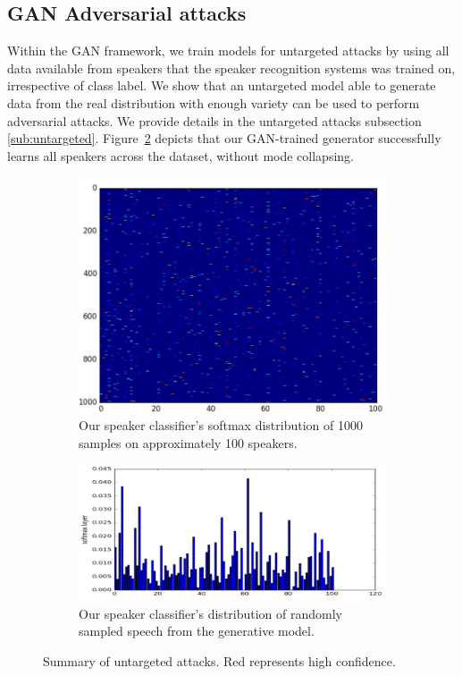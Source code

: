 \subsection{GAN Adversarial attacks}

Within the GAN framework, we train models for untargeted attacks by using all
data available from speakers that the speaker recognition systems was trained on, 
irrespective of class label. We show that an untargeted model able to generate 
data from the real distribution with enough variety can be used to perform 
adversarial attacks. We provide details in the untargeted attacks 
subsection \ref{sub:untargeted}. Figure~\ref{fig:histogram_untargeted} depicts
that our GAN-trained generator successfully learns all speakers across the
dataset, without mode collapsing.
\begin{figure}[t]
    \centering
    \begin{subfigure}[b]{0.4\textwidth}
        \includegraphics[width=\textwidth]{./fig/conf_mat_untargeted.png}
        \caption{Our speaker classifier's softmax distribution of 1000 samples 
        on approximately 100 speakers.}
        \label{fig:cm_untargeted}
    \end{subfigure}
    \qquad
    \begin{subfigure}[b]{0.4\textwidth}
        \includegraphics[width=\textwidth]{./fig/histogram_untargeted.png}
        \caption{Our speaker classifier's distribution of randomly sampled 
        speech from the generative model.}
        \label{fig:histogram_untargeted}
    \end{subfigure}
    \caption{Summary of untargeted attacks. Red represents high confidence.}
    \label{fig:histogram_summary}
\end{figure}

